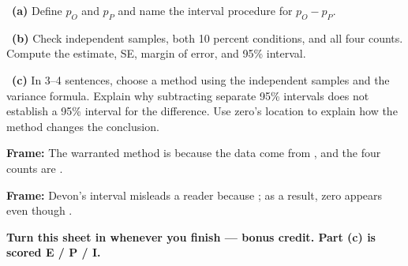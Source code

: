 \documentclass[11pt]{article}
\begin{document}
~\textbf{(a)} Define $p_O$ and $p_P$ and name the interval procedure for $p_O-p_P$.\par
\workspace{0.7in}

~\textbf{(b)} Check independent samples, both 10 percent conditions, and all four counts. Compute the estimate, SE, margin of error, and 95\% interval.\par
\workspace{1.4in}

~\textbf{(c)} In 3--4 sentences, choose a method using the independent samples and the variance formula. Explain why subtracting separate 95\% intervals does not establish a 95\% interval for the difference. Use zero's location to explain how the method changes the conclusion.\par
\workspace{2.0in}

\begin{sentenceframebox}\raggedright\textbf{Frame:} The warranted method is \blank[1.0in] because the data come from \blank[2.2in], and the four counts are \blank[1.5in].\end{sentenceframebox}

\begin{sentenceframebox}\raggedright\textbf{Frame:} Devon's interval misleads a reader because \blank[2.4in]; as a result, zero appears \blank[0.8in] even though \blank[2.2in].\end{sentenceframebox}

\textbf{Turn this sheet in whenever you finish --- bonus credit. Part (c) is scored E / P / I.}\par
\end{document}

